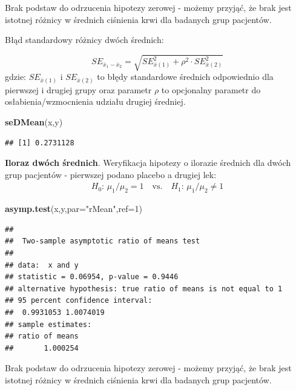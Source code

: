 \documentclass[polish,]{book}
\newenvironment{Shaded}{\begin{snugshade}}{\end{snugshade}}
\newcommand{\DataTypeTok}[1]{\textcolor[rgb]{0.13,0.29,0.53}{#1}}
\newcommand{\DecValTok}[1]{\textcolor[rgb]{0.00,0.00,0.81}{#1}}
\newcommand{\KeywordTok}[1]{\textcolor[rgb]{0.13,0.29,0.53}{\textbf{#1}}}
\newcommand{\NormalTok}[1]{#1}
\newcommand{\StringTok}[1]{\textcolor[rgb]{0.31,0.60,0.02}{#1}}
\begin{document}
Brak podstaw do odrzucenia hipotezy zerowej - możemy przyjąć, że brak jest istotnej różnicy w średnich ciśnienia krwi dla badanych grup pacjentów.

Błąd standardowy różnicy dwóch średnich:

\begin{equation}
SE_{\bar{x}_1-\bar{x}_2}=\sqrt{
SE^2_{\bar{x}(1)}+\rho^2\cdot SE^2_{\bar{x}(2)}
}
\label{eq:wz1142}
\end{equation}
gdzie: \(SE_{\bar{x}(1)}\) i \(SE_{\bar{x}(2)}\) to błędy standardowe średnich odpowiednio dla pierwszej i drugiej grupy oraz parametr \(\rho\) to opcjonalny parametr do osłabienia/wzmocnienia udziału drugiej średniej.

\begin{Shaded}
\begin{Highlighting}[]
\KeywordTok{seDMean}\NormalTok{(x,y)}
\end{Highlighting}
\end{Shaded}

\begin{verbatim}
## [1] 0.2731128
\end{verbatim}

\textbf{Iloraz dwóch średnich}. Weryfikacja hipotezy o ilorazie średnich dla dwóch grup pacjentów - pierwszej podano placebo a drugiej lek:
\[
\begin{array}{ll}
H_0:\,\mu_1/\mu_2 = 1\quad\mbox{vs.}\quad H_1:\,\mu_1/\mu_2 \neq 1
\end{array}
\]

\begin{Shaded}
\begin{Highlighting}[]
\KeywordTok{asymp.test}\NormalTok{(x,y,}\DataTypeTok{par=}\StringTok{"rMean"}\NormalTok{,}\DataTypeTok{ref=}\DecValTok{1}\NormalTok{)}
\end{Highlighting}
\end{Shaded}

\begin{verbatim}
## 
##  Two-sample asymptotic ratio of means test
## 
## data:  x and y
## statistic = 0.06954, p-value = 0.9446
## alternative hypothesis: true ratio of means is not equal to 1
## 95 percent confidence interval:
##  0.9931053 1.0074019
## sample estimates:
## ratio of means 
##       1.000254
\end{verbatim}

Brak podstaw do odrzucenia hipotezy zerowej - możemy przyjąć, że brak jest istotnej różnicy w średnich ciśnienia krwi dla badanych grup pacjentów.
\end{document}
